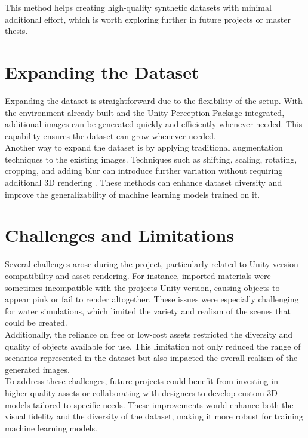 \noindent This method helps creating high-quality synthetic datasets with minimal additional effort, which is worth exploring further in future projects or master thesis.


\section{Expanding the Dataset}
Expanding the dataset is straightforward due to the flexibility of the setup. With the environment already built and the Unity Perception Package \cite{unity-perception2022} integrated, additional images can be generated quickly and efficiently whenever needed. This capability ensures the dataset can grow whenever needed. \\

\noindent Another way to expand the dataset is by applying traditional augmentation techniques to the existing images. Techniques such as shifting, scaling, rotating, cropping, and adding blur can introduce further variation without requiring additional 3D rendering \cite{nikolenko2021synthetic}. These methods can enhance dataset diversity and improve the generalizability of machine learning models trained on it.


\section{Challenges and Limitations}
Several challenges arose during the project, particularly related to Unity version compatibility and asset rendering. For instance, imported materials were sometimes incompatible with the projects Unity version, causing objects to appear pink or fail to render altogether. These issues were especially challenging for water simulations, which limited the variety and realism of the scenes that could be created.\\

\noindent Additionally, the reliance on free or low-cost assets restricted the diversity and quality of objects available for use. This limitation not only reduced the range of scenarios represented in the dataset but also impacted the overall realism of the generated images.\\

\noindent To address these challenges, future projects could benefit from investing in higher-quality assets or collaborating with designers to develop custom 3D models tailored to specific needs. These improvements would enhance both the visual fidelity and the diversity of the dataset, making it more robust for training machine learning models.



